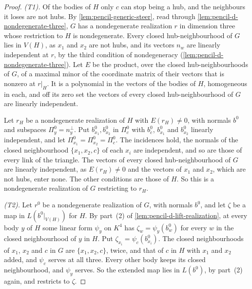 \begin{proof}
  \leanok
  \emph{(T1).} Of the bodies of $H$ only $c$ can stop being a hub, and the
  neighbours it loses are not hubs. By \cref{lem:pencil-generic-steer},
  read through \cref{lem:pencil-d-nondegenerate-three}, $G$ has a
  nondegenerate realization $r$ in dimension three whose restriction to
  $H$ is nondegenerate. Every closed hub-neighbourhood of $G$ lies in
  $V(H)$, as $x_1$ and $x_2$ are not hubs, and its vectors $n_w$ are
  linearly independent at $r$, by the third condition of nondegeneracy
  (\cref{lem:pencil-d-nondegenerate-three}). Let $E$ be the product, over
  the closed hub-neighbourhoods of $G$, of a maximal minor of the
  coordinate matrix of their vectors that is nonzero at $r|_H$. It is a
  polynomial in the vectors of the bodies of $H$, homogeneous in each,
  and off its zero set the vectors of every closed hub-neighbourhood of
  $G$ are linearly independent.

  Let $r_H$ be a nondegenerate realization of $H$ with $E(r_H) \ne 0$, with
  normals $b^0$ and subspaces $\Pi^0_y = n_y^{\perp}$. Put
  $b^0_{x_1}, b^0_{x_2}$ in $\Pi^0_c$ with $b^0_c$, $b^0_{x_1}$ and
  $b^0_{x_2}$ linearly independent, and let
  $\Pi^0_{x_1} = \Pi^0_{x_2} = \Pi^0_c$. The incidences hold, the normals
  of the closed neighbourhood $\{x_1, x_2, c\}$ of each $x_i$ are
  independent, and so are those of every link of the triangle. The
  vectors of every closed hub-neighbourhood of $G$ are linearly
  independent, as $E(r_H) \ne 0$ and the vectors of $x_1$ and $x_2$,
  which are not hubs, enter none. The other conditions are those of $H$.
  So this is a nondegenerate realization of $G$ restricting to $r_H$.

  \emph{(T2).} Let $r^0$ be a nondegenerate realization of $G$, with
  normals $b^0$, and let $\zeta$ be a map in $L(b^0|_{V(H)})$ for $H$. By
  part~(2) of \cref{lem:pencil-d-lift-realization}, at every body $y$ of
  $H$ some linear form $\psi_y$ on $K^4$ has $\zeta_w = \psi_y(b^0_w)$
  for every $w$ in the closed neighbourhood of $y$ in $H$. Put
  $\zeta_{x_i} = \psi_c(b^0_{x_i})$. The closed neighbourhoods of $x_1$,
  $x_2$ and $c$ in $G$ are $\{x_1, x_2, c\}$, twice, and that of $c$ in
  $H$ with $x_1$ and $x_2$ added, and $\psi_c$ serves at all three. Every
  other body keeps its closed neighbourhood, and $\psi_y$ serves. So the
  extended map lies in $L(b^0)$, by part~(2) again, and restricts to
  $\zeta$.


\end{proof}
